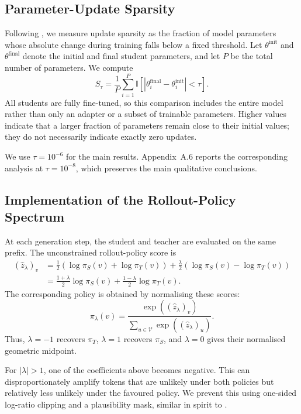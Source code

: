 \documentclass{article} %
\theoremstyle{plain}
\theoremstyle{definition}
\theoremstyle{remark}
\begin{document}
\subsection{Parameter-Update Sparsity}
\label{app:update-sparsity}

Following \citet{mukherjee_reinforcement_2025}, we measure update sparsity as the fraction of model parameters whose absolute change during training falls below a fixed threshold.
Let $\theta^{\mathrm{init}}$ and $\theta^{\mathrm{final}}$ denote the initial and final student parameters, and let $P$ be the total number of parameters.
We compute
\[
    S_{\tau}
    =
    \frac{1}{P}
    \sum_{i=1}^{P}
    \mathbb{I}
    \left[
        \left|
            \theta_i^{\mathrm{final}}
            -
            \theta_i^{\mathrm{init}}
        \right|
        < \tau
    \right].
\]
All students are fully fine-tuned, so this comparison includes the entire model rather than only an adapter or a subset of trainable parameters.
Higher values indicate that a larger fraction of parameters remain close to their initial values; they do not necessarily indicate exactly zero updates.

We use $\tau = 10^{-6}$ for the main results.
Appendix~A.6 reports the corresponding analysis at $\tau = 10^{-8}$, which preserves the main qualitative conclusions.


\subsection{Implementation of the Rollout-Policy Spectrum}
\label{app:rollout_spectrum}

At each generation step, the student and teacher are evaluated on the same prefix. The unconstrained rollout-policy score is
\begin{align}
(\hat z_\lambda)_v
&=
\frac{1}{2}
\left(
\log\pi_S(v)+\log\pi_T(v)
\right)
+
\frac{\lambda}{2}
\left(
\log\pi_S(v)-\log\pi_T(v)
\right)
\\
&=
\frac{1+\lambda}{2}\log\pi_S(v)
+
\frac{1-\lambda}{2}\log\pi_T(v).
\end{align}
The corresponding policy is obtained by normalising these scores:
\[
\pi_\lambda(v)
=
\frac{\exp((\hat z_\lambda)_v)}
{\sum_{u\in\mathcal{V}}\exp((\hat z_\lambda)_u)}.
\]
Thus, \(\lambda=-1\) recovers \(\pi_T\), \(\lambda=1\) recovers \(\pi_S\), and \(\lambda=0\) gives their normalised geometric midpoint.

For \(|\lambda|>1\), one of the coefficients above becomes negative. This can disproportionately amplify tokens that are unlikely under both policies but relatively less unlikely under the favoured policy. We prevent this using one-sided log-ratio clipping and a plausibility mask, similar in spirit to \citet{li2023contrastivedecodingopenendedtext}.
\end{document}
